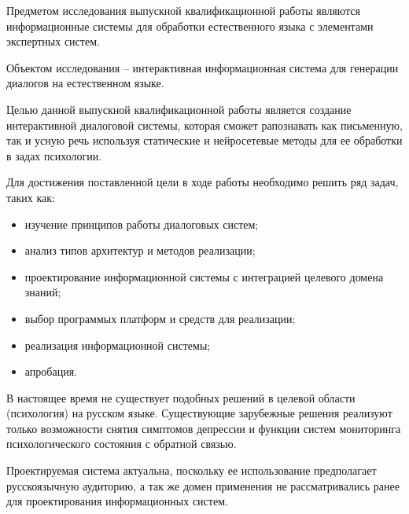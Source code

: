 Предметом исследования выпускной квалификационной работы являются информационные системы для обработки естественного языка с элементами экспертных систем. 

Объектом исследования – интерактивная информационная система для генерации диалогов на естественном языке. 

Целью данной выпускной квалификационной работы является создание интерактивной диалоговой системы, которая сможет рапознавать как письменную, так и усную речь используя статические и нейросетевые методы для ее обработки в задах психологии.

Для достижения поставленной цели в ходе работы необходимо решить ряд задач, таких как: 
\begin{itemize}
\item изучение принципов работы диалоговых систем;
\item анализ типов архитектур и методов реализации;
\item проектирование информационной системы с интеграцией целевого домена знаний; 
\item выбор программых платформ и средств для реализации;
\item реализация информационной системы;
\item апробация.
\end{itemize}

В настоящее время не существует подобных решений в целевой области (психология) на русском языке. Существующие зарубежные решения реализуют только возможности снятия симптомов депрессии и функции систем мониторинга психологического состояния с обратной связью. 

Проектируемая система актуальна, поскольку ее использование предполагает русскоязычную аудиторию, а так же домен применения не рассматривались ранее для проектирования информационных систем. 